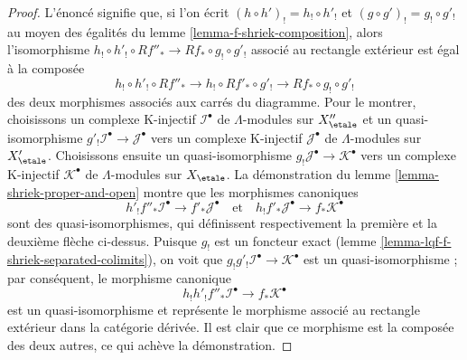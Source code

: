 \begin{proof}
L'énoncé signifie que, si l'on écrit
$(h \circ h')_! = h_! \circ h'_!$ et
$(g \circ g')_! = g_! \circ g'_!$
au moyen des égalités du lemme \ref{lemma-f-shriek-composition},
alors l'isomorphisme
$h_! \circ h'_! \circ Rf''_* \to Rf_* \circ g_! \circ g'_!$
associé au rectangle extérieur est égal à la composée
$$
h_! \circ h'_! \circ Rf''_* \to
h_! \circ Rf'_* \circ g'_! \to
Rf_* \circ g_! \circ g'_!
$$
des deux morphismes associés aux carrés du diagramme. Pour le montrer, choisissons
un complexe K-injectif $\mathcal{I}^\bullet$ de $\Lambda$-modules
sur $X''_\etale$ et un quasi-isomorphisme
$g'_!\mathcal{I}^\bullet \to \mathcal{J}^\bullet$
vers un complexe K-injectif $\mathcal{J}^\bullet$ de $\Lambda$-modules
sur $X'_\etale$. Choisissons ensuite un quasi-isomorphisme
$g_!\mathcal{J}^\bullet \to \mathcal{K}^\bullet$
vers un complexe K-injectif $\mathcal{K}^\bullet$ de $\Lambda$-modules
sur $X_\etale$.
La démonstration du lemme \ref{lemma-shriek-proper-and-open} montre que les morphismes
canoniques
$$
h'_!f''_*\mathcal{I}^\bullet \to f'_*\mathcal{J}^\bullet
\quad\text{et}\quad
h_!f'_*\mathcal{J}^\bullet \to f_*\mathcal{K}^\bullet
$$
sont des quasi-isomorphismes, qui définissent respectivement la
première et la deuxième flèche ci-dessus. Puisque $g_!$ est un foncteur exact
(lemme \ref{lemma-lqf-f-shriek-separated-colimits}),
on voit que $g_!g'_!\mathcal{I}^\bullet \to \mathcal{K}^\bullet$
est un quasi-isomorphisme ; par conséquent, le morphisme canonique
$$
h_!h'_!f''_*\mathcal{I}^\bullet \to f_*\mathcal{K}^\bullet
$$
est un quasi-isomorphisme et représente le morphisme associé au rectangle
extérieur dans la catégorie dérivée. Il est clair que ce morphisme est la
composée des deux autres, ce qui achève la démonstration.
\end{proof}

